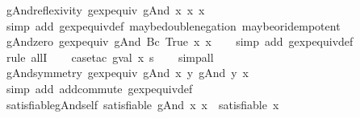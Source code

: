 \begin{isabellebody}
\endisatagproof
{\isafoldproof}%
%
\isadelimproof
\isanewline
%
\endisadelimproof
\isanewline
{}\isamarkupfalse%
\ gAnd{\isacharunderscore}reflexivity{\isacharcolon}\ {\isachardoublequoteopen}gexp{\isacharunderscore}equiv\ {\isacharparenleft}gAnd\ x\ x{\isacharparenright}\ x{\isachardoublequoteclose}\isanewline
%
\isadelimproof
\ \ %
\endisadelimproof
%
\isatagproof
{}\isamarkupfalse%
\ {\isacharparenleft}simp\ add{\isacharcolon}\ gexp{\isacharunderscore}equiv{\isacharunderscore}def\ maybe{\isacharunderscore}double{\isacharunderscore}negation\ maybe{\isacharunderscore}or{\isacharunderscore}idempotent{\isacharparenright}%
\endisatagproof
{\isafoldproof}%
%
\isadelimproof
\isanewline
%
\endisadelimproof
\isanewline
{}\isamarkupfalse%
\ gAnd{\isacharunderscore}zero{\isacharcolon}\ {\isachardoublequoteopen}gexp{\isacharunderscore}equiv\ {\isacharparenleft}gAnd\ {\isacharparenleft}Bc\ True{\isacharparenright}\ x{\isacharparenright}\ x{\isachardoublequoteclose}\isanewline
%
\isadelimproof
\ \ %
\endisadelimproof
%
\isatagproof
{}\isamarkupfalse%
\ {\isacharparenleft}simp\ add{\isacharcolon}\ gexp{\isacharunderscore}equiv{\isacharunderscore}def{\isacharparenright}\isanewline
\ \ \isamarkupfalse%
\ {\isacharparenleft}rule\ allI{\isacharparenright}\isanewline
\ \ \isamarkupfalse%
\ {\isacharparenleft}case{\isacharunderscore}tac\ {\isachardoublequoteopen}gval\ x\ s{\isachardoublequoteclose}{\isacharparenright}\isanewline
\ \ \isamarkupfalse%
\ simp{\isacharunderscore}all%
\endisatagproof
{\isafoldproof}%
%
\isadelimproof
\isanewline
%
\endisadelimproof
\isanewline
{}\isamarkupfalse%
\ gAnd{\isacharunderscore}symmetry{\isacharcolon}\ {\isachardoublequoteopen}gexp{\isacharunderscore}equiv\ {\isacharparenleft}gAnd\ x\ y{\isacharparenright}\ {\isacharparenleft}gAnd\ y\ x{\isacharparenright}{\isachardoublequoteclose}\isanewline
%
\isadelimproof
\ \ %
\endisadelimproof
%
\isatagproof
{}\isamarkupfalse%
\ {\isacharparenleft}simp\ add{\isacharcolon}\ add{\isachardot}commute\ gexp{\isacharunderscore}equiv{\isacharunderscore}def{\isacharparenright}%
\endisatagproof
{\isafoldproof}%
%
\isadelimproof
\isanewline
%
\endisadelimproof
\isanewline
{}\isamarkupfalse%
\ satisfiable{\isacharunderscore}gAnd{\isacharunderscore}self{\isacharcolon}\ {\isachardoublequoteopen}satisfiable\ {\isacharparenleft}gAnd\ x\ x{\isacharparenright}\ {\isacharequal}\ satisfiable\ x{\isachardoublequoteclose}\isanewline
%
\isadelimproof
\ \ %
\endisadelimproof

\end{isabellebody}
